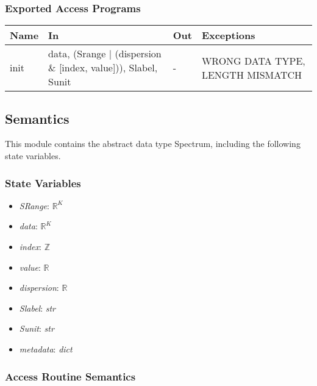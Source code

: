\documentclass[12pt, titlepage]{article}
\begin{document}
\subsubsection{Exported Access Programs}

\begin{center}
    \begin{tabular}{p{1.5cm} p{4cm} p{4cm} p{4cm}}
        \toprule
        \textbf{Name} & \textbf{In} & \textbf{Out} & \textbf{Exceptions} \\
        \midrule
        init & data, (Srange $|$ (dispersion $\&$ [index, value])), Slabel, Sunit & - &
        WRONG DATA TYPE, LENGTH MISMATCH \\
        \bottomrule
    \end{tabular}
\end{center}

\subsection{Semantics}
This module contains the abstract data type Spectrum, including the following
state variables.
\subsubsection{State Variables}
\begin{itemize}
    \item \textit{SRange}: $\mathbb{R}^K$
    \item \textit{data}: $\mathbb{R}^K$
    \item \textit{index}: $\mathbb{Z}$
    \item \textit{value}: $\mathbb{R}$
    \item \textit{dispersion}: $\mathbb{R}$
    \item \textit{Slabel}: \textit{str}
    \item \textit{Sunit}: \textit{str}
    \item \textit{metadata}: \textit{dict}
\end{itemize}

\subsubsection{Access Routine Semantics}
\end{document}
